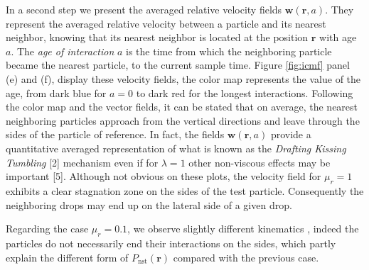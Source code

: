 \documentclass[9pt,a4paper]{article}
\begin{document}
In a second step we present the averaged relative velocity fields $\textbf{w}(\textbf{r},a)$.
They represent the averaged relative velocity between a particle and its nearest neighbor, knowing that its nearest neighbor is located at the position $\textbf{r}$ with age $a$.
The \textit{age of interaction} $a$ is the time from which the neighboring particle became the nearest particle, to the current sample time. 
Figure \ref{fig:icmf} panel (e) and (f), display these velocity fields, the color map represents the value of the age, from dark blue for $a = 0$ to dark red for the longest interactions. 
Following the color map and the vector fields, it can be stated that on average, the nearest neighboring particles approach from the vertical directions and leave through the sides of the particle of reference. 
In fact, the fields $\textbf{w}(\textbf{r},a)$ provide a quantitative averaged representation of what is known as the \textit{Drafting Kissing Tumbling} [2] mechanism even if for $\lambda=1$ other non-viscous effects may be important [5].
Although not obvious on these plots, the velocity field for $\mu_r = 1$ exhibits a clear stagnation zone on the sides of the test particle.
Consequently the neighboring drops may end up on the lateral side of a given drop. %

Regarding the case $\mu_r =0.1$, we observe slightly different kinematics  , indeed the particles do not necessarily end their interactions on the sides, which partly explain the different form of $P_\text{nst}(\textbf{r})$ compared with the previous case.
\end{document}
